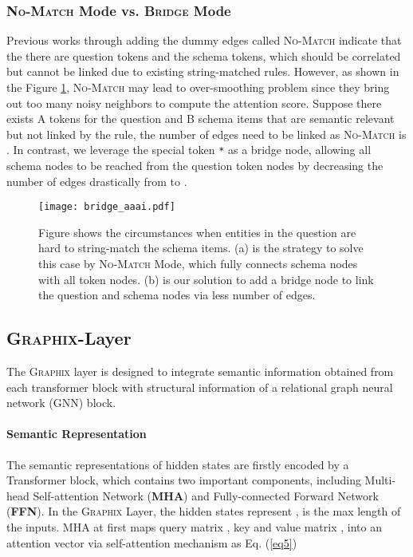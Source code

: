 \documentclass[letterpaper]{article} \usepackage{aaai23}  \usepackage{times}  \usepackage{helvet}  \usepackage{courier}  \usepackage[hyphens]{url}  \usepackage{graphicx} \usepackage{amsmath}
\newcommand{\graphix}{\textsc{Graphix}\xspace}
\begin{document}
\subsubsection{\textsc{No-Match} Mode vs. \textsc{Bridge} Mode}
Previous works \citep{lgesql, s2sql} through adding the dummy edges called \textsc{No-Match} indicate that the there are question tokens and the schema tokens, which should be correlated but cannot be linked due to existing string-matched rules.
However, as shown in the Figure \ref{bridge}, \textsc{No-Match} may lead to over-smoothing problem \citep{over-smoothing} since they bring out too many noisy neighbors to compute the attention score.
Suppose there exists A tokens for the question and B schema items that are semantic relevant but not linked by the rule, the number of edges need to be linked as \textsc{No-Match} is .
In contrast, we leverage the special token \texttt{*} as a bridge node, allowing all schema nodes to be reached from the question token nodes by decreasing the number of edges drastically from  to .


\begin{figure}
    \centering
    \texttt{[image: bridge\_aaai.pdf]}
    \caption{Figure shows the circumstances when entities in the question are hard to string-match the schema items. (a) is the strategy to solve this case by \textsc{No-Match} Mode, which fully connects schema nodes with all token nodes. (b) is our solution to add a bridge node to link the question and schema nodes via less number of edges.}
    \vspace{-0.3cm}
    \label{bridge}
\end{figure}


\subsection{\graphix-Layer}
The \graphix layer is designed to integrate semantic information obtained from each transformer block with structural information of a relational graph neural network (GNN) block. 
\paragraph{Semantic Representation}
The semantic representations of hidden states are firstly encoded by a Transformer \citep{transformer} block, which contains two important components, including Multi-head Self-attention Network (\textbf{MHA}) and Fully-connected Forward Network (\textbf{FFN}). In the  \graphix Layer, the hidden states represent ,  is the max length of the inputs. 
MHA at first maps query matrix , key and value matrix ,  into an attention vector via self-attention mechanism as Eq. (\ref{eq5})
\end{document}
